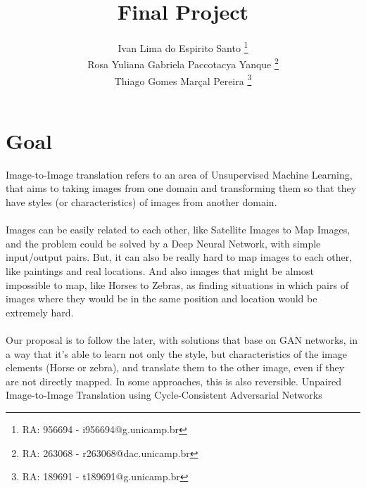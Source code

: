 \documentclass[]{IEEEtran}
\begin{document}
\title{Final Project}
\author{Ivan Lima do Espirito Santo \thanks{RA: 956694 - i956694@g.unicamp.br}\\ Rosa Yuliana Gabriela Paccotacya Yanque \thanks{RA: 263068 - r263068@dac.unicamp.br} \\ Thiago Gomes Marçal Pereira \thanks{RA: 189691 - t189691@g.unicamp.br}}

\maketitle

\section{Goal}
Image-to-Image translation refers to an area of Unsupervised Machine Learning, that aims to taking images from one domain and transforming them so that they have styles (or characteristics) of images from another domain.\\\\
Images can be easily related to each other, like Satellite Images to Map Images, and the problem could be solved by a Deep Neural Network, with simple input/output pairs. But, it can also be really hard to map images to each other, like paintings and real locations. And also images that might be almost impossible to map, like Horses to Zebras, as finding situations in which pairs of images where they would be in the same position and location would be extremely hard. \\\\
Our proposal is to follow the later, with solutions that base on GAN networks, in a way that it's able to learn not only the style, but characteristics of the image elements (Horse or zebra), and translate them to the other image, even if they are not directly mapped. In some approaches, this is also reversible.
Unpaired Image-to-Image Translation using Cycle-Consistent Adversarial Networks
\end{document}

